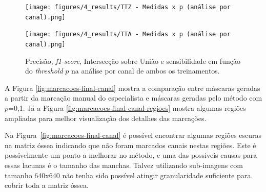 \begin{figure}
    \center
    \texttt{[image: figures/4\_results/TTZ - Medidas x p (análise por canal).png]}

    \texttt{[image: figures/4\_results/TTA - Medidas x p (análise por canal).png]}
  
    \caption[Métricas obtidas na análise por canal para ambos os treinamentos.]{Precisão, \textit{f1-score}, Intersecção sobre União e sensibilidade em função do \textit{threshold} $p$ na análise por canal de ambos os treinamentos.}
    \label{fig:graphic-metrics-x-p-per-canal}
\end{figure}




A Figura \ref{fig:marcacoes-final-canal} mostra a comparação entre máscaras geradas a partir da marcação manual do especialista e máscaras geradas pelo método com $p$=0,1. Já a Figura \ref{fig:marcacoes-final-canal-regioes} mostra algumas regiões ampliadas para melhor visualização dos detalhes das marcações.

Na Figura~\ref{fig:marcacoes-final-canal} é possível encontrar algumas regiões escuras na matriz óssea indicando que não foram marcados canais nestas regiões. Este é possivelmente um ponto a melhorar no método, e uma das possíveis causas para essas lacunas é o tamanho das manchas. Talvez utilizando sub-imagens com tamanho 640x640 não tenha sido possível atingir granularidade suficiente para cobrir toda a matriz óssea.

